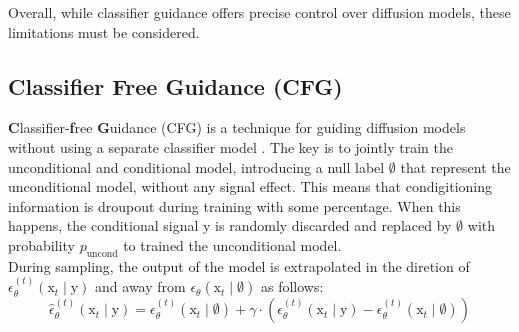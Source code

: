 \noindent Overall, while classifier guidance offers precise control over diffusion models,
these limitations must be considered.


\subsection{Classifier Free Guidance (CFG)}

\textbf{C}lassifier-\textbf{f}ree \textbf{G}uidance (CFG) is a technique for guiding diffusion models without using a separate classifier model \cite{Ho2022ClassifierFreeDG}. The key is to jointly train the unconditional and conditional model, introducing a null label $\emptyset$ that 
represent the unconditional model, without any signal effect. This means
that condigitioning information is droupout during training with some percentage. When this happens, the conditional signal $\mathrm{y}$ is randomly discarded and replaced by $\emptyset$ with probability $p_{\text{uncond}}$ to trained the unconditional model. \\

\noindent During sampling, the output of the model is extrapolated in the diretion of
$\epsilon_{\theta}^{(t)}(\mathrm{x}_{t}\mid\mathrm{y})$ and away from
$\epsilon_{\theta}(\mathrm{x}_{t}\mid\emptyset)$ as follows: \\

\begin{equation}\label{eqn:cfg}
    \hat{\epsilon}_{\theta}^{(t)}(\mathrm{x}_{t}\mid\mathrm{y}) = \epsilon_{\theta}^{(t)}(\mathrm{x}_{t}\mid\emptyset) + \gamma \cdot (\epsilon_{\theta}^{(t)}(\mathrm{x}_{t}\mid\mathrm{y}) - \epsilon_{\theta}^{(t)}(\mathrm{x}_{t}\mid\emptyset))
\end{equation}





